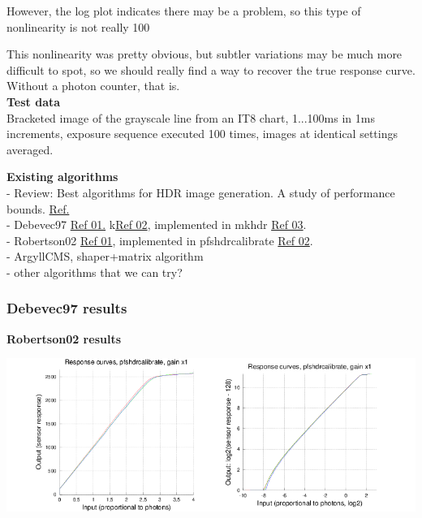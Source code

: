However, the log plot indicates there may be a problem, so this type of nonlinearity is not really 100%

This nonlinearity was pretty obvious, but subtler variations may be much more difficult to spot, so we should really find a way to recover the true response curve. Without a photon counter, that is. \\

\textbf{Test data}\\

Bracketed image of the grayscale line from an IT8 chart, 1...100ms in 1ms increments, exposure sequence executed 100 times, images at identical settings averaged. 

\begin{center}
\end{center}

\textbf{Existing algorithms}\\

- Review: Best algorithms for HDR image generation. A study of performance bounds. \href{https://hal.archives-ouvertes.fr/file/index/docid/733853/filename/best_hdr_algo_hal.pdf}{Ref.}\\
- Debevec97 \href{http://www.pauldebevec.com/Research/HDR/debevec-siggraph97.pdf}{Ref 01.} k\href{http://pages.cs.wisc.edu/~csverma/CS766_09/HDRI/hdr.html}{Ref 02}, implemented in mkhdr \href{http://duikerresearch.com/mkhdr-archive/}{Ref 03}.\\
- Robertson02 \href{http://pages.cs.wisc.edu/~lizhang/courses/cs766-2008f/projects/hdr/Robertson2003ETA.pdf}{Ref 01}, implemented in pfshdrcalibrate \href{http://resources.mpi-inf.mpg.de/hdr/calibration/pfs.html}{Ref 02}.\\
- ArgyllCMS, shaper+matrix algorithm\\
- other algorithms that we can try? \\


\subsubsection{Debevec97 results}

\textbf{Robertson02 results}

\begin{center}
\includegraphics[height=5cm]{images/response-curve-pfs}
\end{center}

